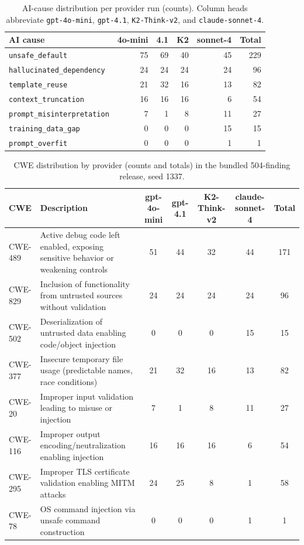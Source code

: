 \documentclass[sigconf,review,anonymous=false]{acmart}
\begin{document}
\begin{table}[!t]
\centering
\footnotesize
\setlength{\tabcolsep}{3.5pt}
\begin{tabular}{@{}lrrrrr@{}}
\toprule
\textbf{AI cause} & \textbf{4o-mini} & \textbf{4.1} & \textbf{K2} & \textbf{sonnet-4} & \textbf{Total} \\
\midrule
\texttt{unsafe\_default}           & 75 & 69 & 40 & 45 & 229 \\
\texttt{hallucinated\_dependency}  & 24 & 24 & 24 & 24 &  96 \\
\texttt{template\_reuse}           & 21 & 32 & 16 & 13 &  82 \\
\texttt{context\_truncation}       & 16 & 16 & 16 &  6 &  54 \\
\texttt{prompt\_misinterpretation} &  7 &  1 &  8 & 11 &  27 \\
\texttt{training\_data\_gap}       &  0 &  0 &  0 & 15 &  15 \\
\texttt{prompt\_overfit}           &  0 &  0 &  0 &  1 &   1 \\
\bottomrule
\end{tabular}
\caption{AI-cause distribution per provider run (counts). Column
heads abbreviate \texttt{gpt-4o-mini}, \texttt{gpt-4.1},
\texttt{K2-Think-v2}, and \texttt{claude-sonnet-4}.}
\label{tab:ai-cause-distribution}
\end{table}

\begin{table}[t]
\centering
\scriptsize
\setlength{\tabcolsep}{5pt}
\begin{tabular}{l p{5cm} ccccc}
\toprule
\textbf{CWE} & \textbf{Description} & \textbf{gpt-4o-mini} & \textbf{gpt-4.1} & \textbf{K2-Think-v2} & \textbf{claude-sonnet-4} & \textbf{Total} \\
\midrule
CWE-489 & Active debug code left enabled, exposing sensitive behavior or weakening controls
& 51 & 44 & 32 & 44 & 171 \\
CWE-829 & Inclusion of functionality from untrusted sources without validation
& 24 & 24 & 24 & 24 & 96 \\
CWE-502 & Deserialization of untrusted data enabling code/object injection
& 0 & 0 & 0 & 15 & 15 \\
CWE-377 & Insecure temporary file usage (predictable names, race conditions)
& 21 & 32 & 16 & 13 & 82 \\
CWE-20 & Improper input validation leading to misuse or injection
& 7 & 1 & 8 & 11 & 27 \\
CWE-116 & Improper output encoding/neutralization enabling injection
& 16 & 16 & 16 & 6 & 54 \\
CWE-295 & Improper TLS certificate validation enabling MITM attacks
& 24 & 25 & 8 & 1 & 58 \\
CWE-78 & OS command injection via unsafe command construction
& 0 & 0 & 0 & 1 & 1 \\
\bottomrule
\end{tabular}
\caption{CWE distribution by provider (counts and totals) in the
bundled 504-finding release, seed 1337.}
\label{tab:cwe-distribution}
\end{table}
\end{document}
